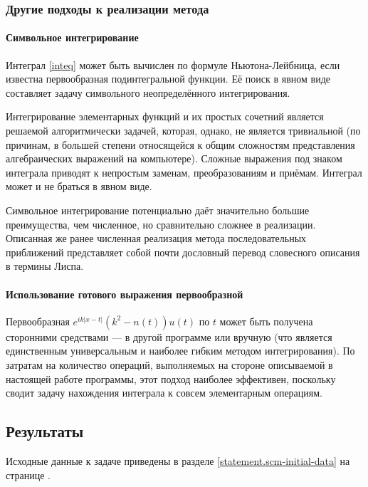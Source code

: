 \documentclass{article}
\providecommand{\abs}[1]{\left \lvert{#1}\right \rvert}
\numberwithin{equation}{section}
\begin{document}
\subsubsection{Другие подходы к реализации метода}

\paragraph{Символьное интегрирование}

Интеграл \eqref{inteq} может быть вычислен по формуле
Ньютона-Лейбница, если известна первообразная подинтегральной
функции. Её поиск в явном виде составляет задачу символьного
неопределённого интегрирования.

Интегрирование элементарных функций и их простых сочетний является
решаемой алгоритмически задачей, которая, однако, не является
тривиальной (по причинам, в большей степени относящейся к общим
сложностям представления алгебраических выражений на
компьютере). Сложные выражения под знаком интеграла приводят к
непростым заменам, преобразованиям и приёмам. Интеграл может и не
браться в явном виде.

Символьное интегрирование потенциально даёт значительно большие
преимущества, чем численное, но сравнительно сложнее в
реализации. Описанная же ранее численная реализация метода
последовательных приближений представляет собой почти дословный
перевод словесного описания в термины Лиспа.

\paragraph{Использование готового выражения первообразной}

Первообразная $e^{ik\abs{x-t}}(k^2-n(t))u(t)$ по $t$ может быть
получена сторонними средствами — в другой программе или вручную (что
является единственным универсальным и наиболее гибким методом
интегрирования). По затратам на количество операций, выполняемых на
стороне описываемой в настоящей работе программы, этот подход наиболее
эффективен, поскольку сводит задачу нахождения интеграла к совсем
элементарным операциям.

\clearpage
\subsection{Результаты}

Исходные данные к задаче приведены в разделе
\ref{statement.scm-initial-data} на странице
\pageref{statement.scm-initial-data}.
\end{document}
